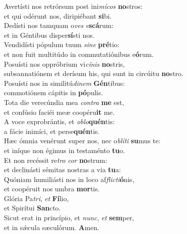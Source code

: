 \evenverse Avertísti nos retrórsum post ini\textit{mí}\textit{cos} \textbf{no}stros:~\*\\
\evenverse et qui odérunt nos, diripiébant \textbf{si}bi.\\
\oddverse Dedísti nos tamquam o\textit{ves} \textit{e}\textbf{scá}rum:~\*\\
\oddverse et in Géntibus disper\textbf{sí}sti nos.\\
\evenverse Vendidísti pópulum tuum \textit{si}\textit{ne} \textbf{pré}tio:~\*\\
\evenverse et non fuit multitúdo in commutatiónibus e\textbf{ó}rum.\\
\oddverse Posuísti nos oppróbrium vi\textit{cí}\textit{nis} \textbf{no}stris,~\*\\
\oddverse subsannatiónem et derísum his, qui sunt in circúitu \textbf{no}stro.\\
\evenverse Posuísti nos in similitú\textit{di}\textit{nem} \textbf{Gén}tibus:~\*\\
\evenverse commotiónem cápitis in \textbf{pó}pulis.\\
\oddverse Tota die verecúndia mea \textit{con}\textit{tra} \textbf{me} est,~\*\\
\oddverse et confúsio faciéi meæ coopéru\textbf{it} me.\\
\evenverse A voce exprobrántis, et \textit{o}\textit{blo}\textbf{quén}tis:~\*\\
\evenverse a fácie inimíci, et perse\textbf{quén}tis.\\
\oddverse Hæc ómnia venérunt super nos, nec o\textit{blí}\textit{ti} \textbf{su}mus te:~\*\\
\oddverse et iníque non égimus in testaménto \textbf{tu}o.\\
\evenverse Et non recéssit re\textit{tro} \textit{cor} \textbf{no}strum:~\*\\
\evenverse et declinásti sémitas nostras a via \textbf{tu}a:\\
\oddverse Quóniam humiliásti nos in loco af\textit{fli}\textit{cti}\textbf{ó}nis,~\*\\
\oddverse et coopéruit nos umbra \textbf{mor}tis.\\
\evenverse Glória Pa\textit{tri}, \textit{et} \textbf{Fí}lio,~\*\\
\evenverse et Spirítui \textbf{San}cto.\\
\oddverse Sicut erat in princípio, et \textit{nunc}, \textit{et} \textbf{sem}per,~\*\\
\oddverse et in sǽcula sæculórum. \textbf{A}men.\\
